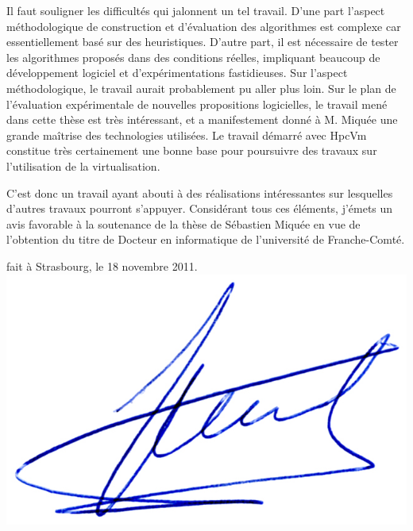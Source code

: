 \documentclass[a4paper,12pt]{article}
\begin{document}
Il faut souligner les difficultés qui jalonnent un tel travail. D'une part
l'aspect méthodologique de construction et d'évaluation des algorithmes est
complexe car essentiellement basé sur des heuristiques. D'autre part, il
est nécessaire de tester les algorithmes proposés dans des conditions réelles,
impliquant beaucoup de développement logiciel et d'expérimentations fastidieuses.
Sur l'aspect méthodologique, le travail aurait probablement pu aller plus loin. 
Sur le plan de l'évaluation expérimentale de nouvelles propositions logicielles, 
le travail mené dans cette thèse est très intéressant, et a manifestement donné 
à M. Miquée une grande maîtrise des technologies utilisées. 
Le travail démarré avec HpcVm constitue très certainement une bonne base pour 
poursuivre des travaux sur l'utilisation de la virtualisation.

C'est donc un travail ayant abouti à des réalisations intéressantes
sur lesquelles d'autres travaux pourront s'appuyer. Considérant tous ces 
éléments, j'émets un avis favorable à la soutenance de la thèse de Sébastien
Miquée en vue de l'obtention du titre de Docteur en informatique de 
l'université de Franche-Comté. 


\begin{flushright}

{\small fait à Strasbourg, le 18 novembre 2011}.\\
\includegraphics[width=.16\textwidth]{signgenaud.jpg}
\end{flushright}
\end{document}
